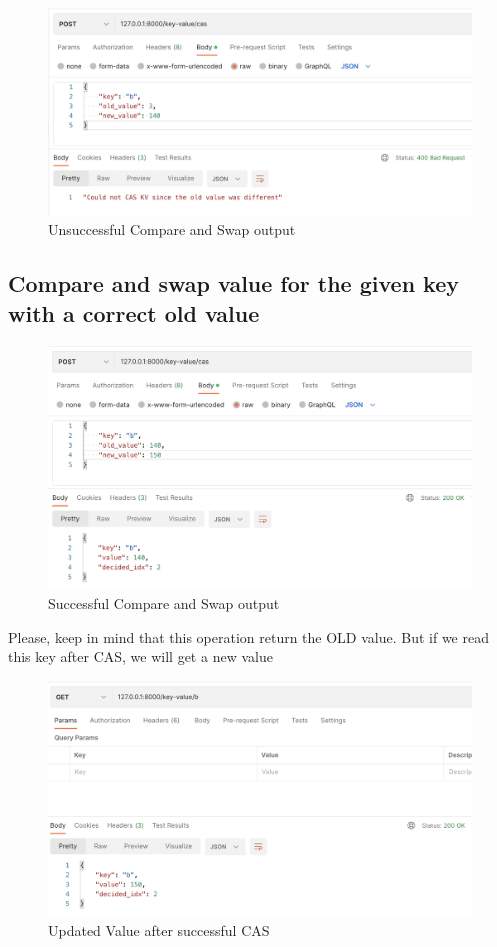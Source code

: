 \documentclass[a4paper, 11pt]{article}
\begin{document}
\begin{figure}[H]
\centering
\includegraphics[width=\textwidth,keepaspectratio]{cas400.png}
\caption{Unsuccessful Compare and Swap output}
\end{figure}

\subsection{Compare and swap value for the given key with a correct old value}

\begin{figure}[H]
\centering
\includegraphics[width=\textwidth,keepaspectratio]{cas200.png}
\caption{Successful Compare and Swap output}
\end{figure}

Please, keep in mind that this operation return the OLD value. But if we read this key after CAS, we will get a new value

\begin{figure}[H]
\centering
\includegraphics[width=\textwidth,keepaspectratio]{getcas.png}
\caption{Updated Value after successful CAS}
\end{figure}
\end{document}
